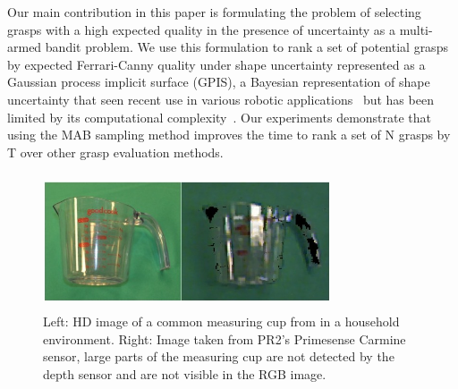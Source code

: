 \documentclass[letterpaper, 10 pt, conference]{ieeeconf}  %
\begin{document}

Our main contribution in this paper is formulating the problem of selecting grasps with a high expected quality in the presence of uncertainty as a multi-armed bandit problem.
We use this formulation to rank a set of potential grasps by expected Ferrari-Canny quality under shape uncertainty represented as a Gaussian process implicit surface (GPIS), a Bayesian representation of shape uncertainty that seen recent use in various robotic applications~\cite{dragiev2011, hollinger2013} but has been limited by its computational complexity~\cite{rasmussen2006, williams2007}.
Our experiments demonstrate that using the MAB sampling method improves the time to rank a set of N grasps by T over other grasp evaluation methods.


\begin{figure}[t!]
\centering
\includegraphics[width=8.5cm,height=4cm]{figures/Slide02.jpg}
\caption{\footnotesize
Left: HD image of a common measuring cup from in a household environment. Right: Image taken from PR2's Primesense Carmine sensor, large parts of the measuring cup are not detected by the depth sensor and are not visible in the RGB image.}
\vspace*{-10pt}
\label{fig:noisy data}
\end{figure}



\end{document}
